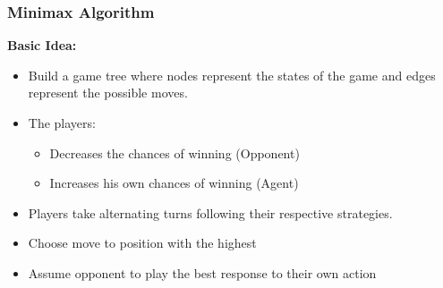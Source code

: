 \documentclass[
../../EiKI_Summary.tex,
]
{subfiles}
\begin{document}
\subsubsection{Minimax Algorithm}
\textbf{Basic Idea:}
\begin{itemize}
    \item Build a game tree where nodes represent the states of the game and edges represent the possible moves.
    \item The players:
    \begin{itemize}
        \item {} Decreases the chances of  winning (Opponent)
        \item {} Increases his own chances of winning (Agent)
    \end{itemize}
    \item Players take alternating turns following their respective strategies.
    \item Choose move to position with the highest 
    \item Assume opponent to play the best response to their own action 
\end{itemize}

\begin{codebox}
    \begin{algorithm}
        [H]

    \end{algorithm}
\end{codebox}
\end{document}
